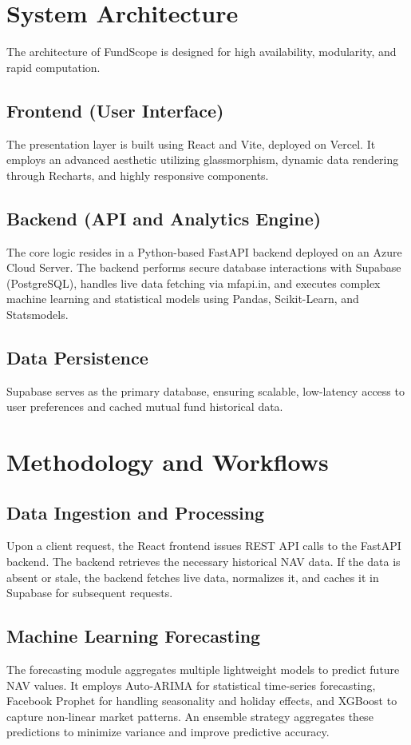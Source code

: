 \documentclass[conference]{IEEEtran}
\begin{document}
\section{System Architecture}
The architecture of FundScope is designed for high availability, modularity, and rapid computation.
\subsection{Frontend (User Interface)}
The presentation layer is built using React and Vite, deployed on Vercel. It employs an advanced aesthetic utilizing glassmorphism, dynamic data rendering through Recharts, and highly responsive components.
\subsection{Backend (API and Analytics Engine)}
The core logic resides in a Python-based FastAPI backend deployed on an Azure Cloud Server. The backend performs secure database interactions with Supabase (PostgreSQL), handles live data fetching via mfapi.in, and executes complex machine learning and statistical models using Pandas, Scikit-Learn, and Statsmodels.
\subsection{Data Persistence}
Supabase serves as the primary database, ensuring scalable, low-latency access to user preferences and cached mutual fund historical data.

\section{Methodology and Workflows}
\subsection{Data Ingestion and Processing}
Upon a client request, the React frontend issues REST API calls to the FastAPI backend. The backend retrieves the necessary historical NAV data. If the data is absent or stale, the backend fetches live data, normalizes it, and caches it in Supabase for subsequent requests.
\subsection{Machine Learning Forecasting}
The forecasting module aggregates multiple lightweight models to predict future NAV values. It employs Auto-ARIMA for statistical time-series forecasting, Facebook Prophet for handling seasonality and holiday effects, and XGBoost to capture non-linear market patterns. An ensemble strategy aggregates these predictions to minimize variance and improve predictive accuracy.
\end{document}
